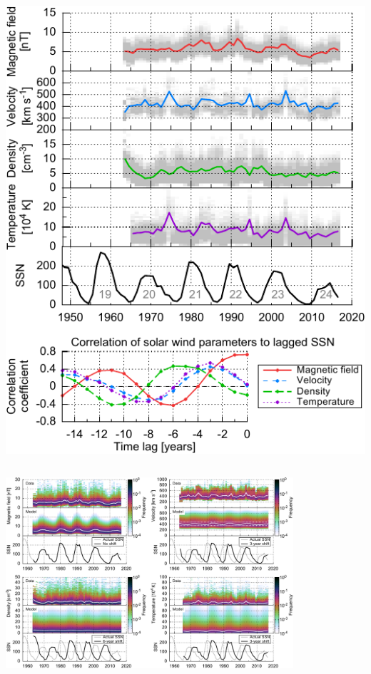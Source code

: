 \documentclass[11pt,aspectratio=1610]{beamer}	%
\newcommand{\captionoftiny}[2]{\captionof{#1}{\color{gray} \tiny #2}}
\begin{document}
\begin{frame}[c]{}{}
	\begin{columns}[c]
		
		\includegraphics[width=\textwidth]{../figures_paper/OMNI_yearly_ssn_correlation_c_plot.pdf}


	\end{columns}
\end{frame}
\begin{frame}[c]{}{}
	\includegraphics[width=0.8\textwidth]{../figures_paper/OMNI_yearly_BVdblNTSSN_fit_e_plot.pdf}
\end{frame}
\end{document}
